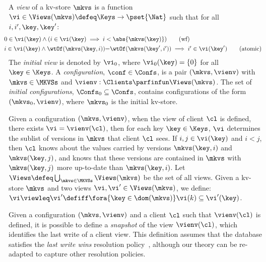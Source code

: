 \begin{definition}[Views]
\label{def:view}
\label{def:cuts}
\label{def:views}
\label{def:configuration}
A \emph{view} of a kv-store $\mkvs$ is a function
$\vi \in \Views(\mkvs) \defeq \Keys \to\pset{\Nat}$ such that for all $i, i', \key, \key'$:
%
{\small
\begin{align}
    & \hspace*{-8pt}
    0 \in \vi(\key) 
    \wedge (i \in \vi(\key) \implies i < \abs{ \mkvs(\key) }) 
    \tag{wf}
    \label{eq:view.wf}\\
    & \hspace*{-8pt}
    \begin{array}{@{}l@{}}
	i \in \vi(\key)  
  	\land \wtOf(\mkvs(\key, i)) {=} \wtOf(\mkvs(\key', i'))  
  	\implies i' \in \vi(\key')
    \end{array}
	\tag{atomic}
	\label{eq:view.atomic}
\end{align}
}
%
\noindent The \emph{initial view} is denoted by $\vi_{0}$, where $\vi_{0}(\key) = \{0\}$ for all $\key \in \Keys$. 
A \emph{configuration}, $\conf \in \Confs$,  is a pair $ (\mkvs, \vienv)$
with $\mkvs \in \MKVSs$ and
$\vienv : \Clients \parfinfun \Views(\mkvs)$. 
The set of \emph{initial configurations}, $\Confs_0 \subseteq \Confs$, contains configurations of the form $ (\mkvs_0, \vienv)$, where $\mkvs_0$ is the initial kv-store. 
\end{definition}
%


Given a configuration $(\mkvs, \vienv)$, when the view of client 
$\cl$ is defined, \ie there exists $\vi = \vienv(\cl)$, then for each key $\key \in \Keys$, 
$\vi$ determines the sublist of versions in $\mkvs$ that client $\cl$ sees. 
If $i,j \in \vi(\key)$ and $i < j$, then $\cl$ knows about the values 
carried by versions $\mkvs(\key, i)$ and  $\mkvs(\key, j)$, 
and  knows that these versions are contained in $\mkvs$ with  $\mkvs(\key, j)$ more 
up-to-date than $\mkvs(\key, i)$. 
Let $\Views \defeq \bigcup_{\mkvs \in \MKVSs} \Views(\mkvs)$ be the set of all views. 
Given a kv-store $\mkvs$ and two views $\vi, \vi' \in \Views(\mkvs)$, 
we define: $\vi \viewleq \vi' \defiff \fora{\key \in \dom(\mkvs)} \vi(k) \subseteq \vi'(\key)$.

Given a configuration $(\mkvs, \vienv)$ and a client $\cl$ such that $\vienv(\cl)$ is
defined, it is possible to define a \emph{snapshot} of the
view $\vienv  (\cl)$, which identifies the last write of a client
view. This definition assumes that the database satisfies the \emph{last write wins}
resolution policy~\cite{framework-concur}, although our theory can be 
re-adapted to capture other resolution policies. 

